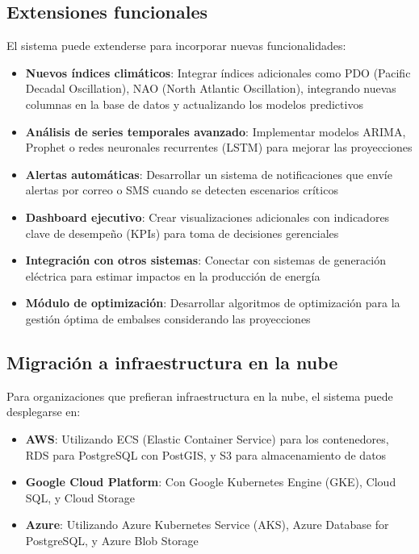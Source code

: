 \subsection{Extensiones funcionales}
\label{subsec:chp7-7-3}

El sistema puede extenderse para incorporar nuevas funcionalidades:

\begin{itemize}
    \item \textbf{Nuevos índices climáticos}: Integrar índices adicionales como PDO (Pacific Decadal Oscillation), NAO (North Atlantic Oscillation), integrando nuevas columnas en la base de datos y actualizando los modelos predictivos
    \item \textbf{Análisis de series temporales avanzado}: Implementar modelos ARIMA, Prophet o redes neuronales recurrentes (LSTM) para mejorar las proyecciones
    \item \textbf{Alertas automáticas}: Desarrollar un sistema de notificaciones que envíe alertas por correo o SMS cuando se detecten escenarios críticos
    \item \textbf{Dashboard ejecutivo}: Crear visualizaciones adicionales con indicadores clave de desempeño (KPIs) para toma de decisiones gerenciales
    \item \textbf{Integración con otros sistemas}: Conectar con sistemas de generación eléctrica para estimar impactos en la producción de energía
    \item \textbf{Módulo de optimización}: Desarrollar algoritmos de optimización para la gestión óptima de embalses considerando las proyecciones
\end{itemize}

\subsection{Migración a infraestructura en la nube}
\label{subsec:chp7-7-4}

Para organizaciones que prefieran infraestructura en la nube, el sistema puede desplegarse en:

\begin{itemize}
    \item \textbf{AWS}: Utilizando ECS (Elastic Container Service) para los contenedores, RDS para PostgreSQL con PostGIS, y S3 para almacenamiento de datos
    \item \textbf{Google Cloud Platform}: Con Google Kubernetes Engine (GKE), Cloud SQL, y Cloud Storage
    \item \textbf{Azure}: Utilizando Azure Kubernetes Service (AKS), Azure Database for PostgreSQL, y Azure Blob Storage
\end{itemize}

